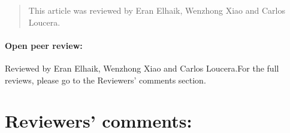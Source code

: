 \documentclass{bmcart}
\begin{document}
\begin{frontmatter}
\begin{abstractbox}
\begin{abstract}
\begin{keyword}
\end{keyword}

This article was reviewed by Eran Elhaik, Wenzhong Xiao and Carlos Loucera.

\end{abstract}

\end{abstractbox}
%

\end{frontmatter}



\clearpage
\newpage
\paragraph{Open peer review:}
Reviewed by Eran Elhaik, Wenzhong Xiao and Carlos Loucera.For the full reviews, please go to the Reviewers' comments section.


\section*{Reviewers' comments:}
\end{document}
